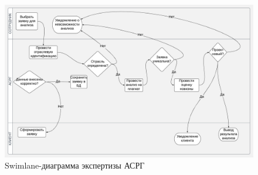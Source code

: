 \begin{figure}[H]
  \begin{center}
    \includegraphics[width=1\textwidth]{authors/kopchenko-fig-1.png}
  \end{center}
  \caption {Swimlane-диаграмма экспертизы АСРГ}

\end{figure}
